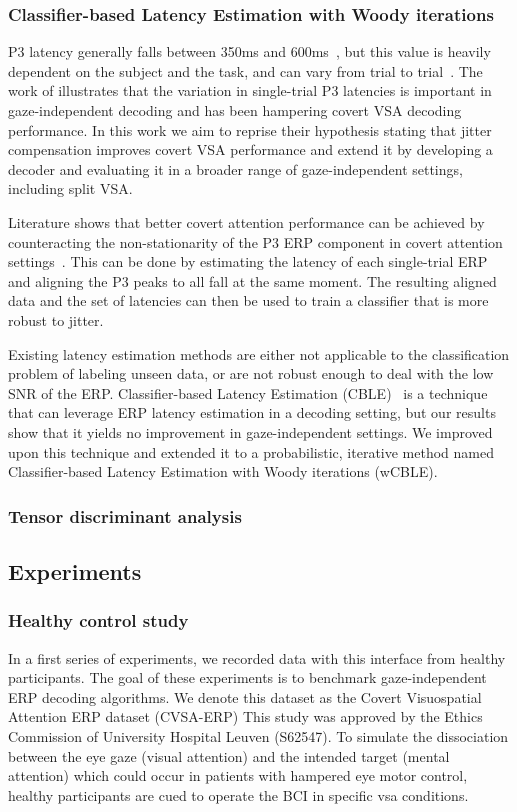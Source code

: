 \subsubsection{Classifier-based Latency Estimation with Woody iterations}

P3 latency generally falls between 350ms and 600ms~\cite{Luck2014}, but this
value is heavily dependent on the subject and the task, and can vary from trial
to trial~\cite{Ouyang2017}.
The work of \cite{Arico2014} illustrates that the variation in single-trial P3
latencies is important in gaze-independent decoding and has been hampering covert
VSA decoding performance.
In this work we aim to reprise their hypothesis stating that jitter compensation improves
covert VSA performance and extend it by developing a decoder and evaluating it
in a broader range of gaze-independent settings, including split VSA.


Literature shows that better covert attention performance can be achieved by
counteracting the non-stationarity of the P3 ERP component in covert
attention settings~\cite{Arico2014}.
This can be done by estimating the latency of each single-trial ERP and aligning
the P3 peaks to all fall at the same moment.
The resulting aligned data and the set of latencies can then be used to train a
classifier that is more robust to jitter.

Existing latency estimation methods are either not applicable to the
classification problem of labeling unseen data, or are not robust enough to
deal with the low SNR of the ERP.
Classifier-based Latency Estimation (CBLE)~\cite{Mowla2017} is a technique that can leverage
ERP latency estimation in a decoding setting, but our results show that it
yields no improvement in gaze-independent settings.
We improved upon this technique and extended it to a probabilistic, iterative
method named Classifier-based Latency Estimation with Woody iterations (wCBLE).

\subsubsection{Tensor discriminant analysis}

\subsection{Experiments}

\subsubsection{Healthy control study}
In a first series of experiments, we recorded data with this interface from healthy participants.
The goal of these experiments is to benchmark
gaze-independent ERP decoding algorithms.
We denote this dataset as the Covert Visuospatial Attention ERP dataset
(CVSA-ERP)
This study was approved by the Ethics Commission of University Hospital Leuven
(S62547).
To simulate the dissociation between the eye gaze (visual attention) and the
intended target (mental attention) which could occur in patients with hampered eye
motor control, healthy participants are cued to operate the BCI in specific
\ac{vsa} conditions.


